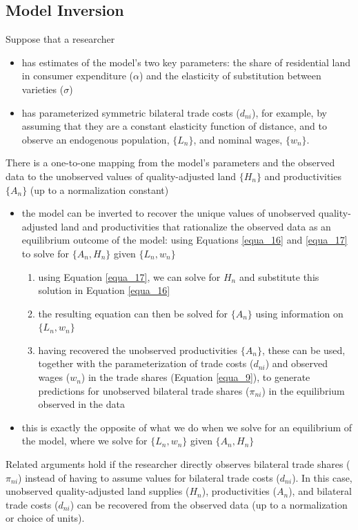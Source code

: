 \documentclass[11pt]{article}
\begin{document}
\subsection*{Model Inversion}
Suppose that a researcher
\begin{itemize}
\item has estimates of the model’s two key parameters: the share of residential land in consumer expenditure ($\alpha$) and the elasticity of substitution between varieties ($\sigma$)
\item has parameterized symmetric bilateral trade costs ($d_{ni}$), for example, by assuming that they are a constant elasticity function of distance, and to observe an endogenous population, $\lbrace L_{n} \rbrace$, and nominal wages, $\lbrace w_{n} \rbrace$. 
\end{itemize}
There is a one-to-one mapping from the model's parameters and the observed data to the unobserved values of quality-adjusted land $\lbrace H_{n} \rbrace$ and productivities $\lbrace A_{n} \rbrace$ (up to a normalization constant)
\begin{itemize}
\item the model can be inverted to recover the unique values of unobserved quality-adjusted land and productivities that rationalize the observed data as an equilibrium outcome of the model: using Equations \ref{equa_16} and \ref{equa_17} to solve for $\lbrace A_{n},H_{n} \rbrace$ given $\lbrace L_{n},w_{n} \rbrace$
\begin{enumerate}
\item using Equation \ref{equa_17}, we can solve for $H_{n}$  and substitute this solution in Equation \ref{equa_16}
\item the resulting equation can then be solved for $\lbrace A_{n} \rbrace$ using information on $\lbrace L_{n},w_{n} \rbrace$
\item having recovered the unobserved productivities $\lbrace A_{n} \rbrace$, these can be used, together with the parameterization of trade costs ($d_{ni}$) and observed wages ($w_{n}$) in the trade shares (Equation \ref{equa_9}), to generate predictions for unobserved bilateral trade shares ($\pi_{ni}$) in the equilibrium observed in the data 
\end{enumerate}
\item this is exactly the opposite of what we do when we solve for an equilibrium of the model, where we solve for $\lbrace L_{n},w_{n} \rbrace$ given $\lbrace A_{n},H_{n} \rbrace$
\end{itemize}
Related arguments hold if the researcher directly observes bilateral trade shares ($\pi_{ni}$) instead of having to assume values for bilateral trade costs ($d_{ni}$). In this case, unobserved quality-adjusted land supplies ($H_{n}$), productivities ($A_{n}$), and bilateral trade costs ($d_{ni}$) can be recovered from the observed data (up to a normalization or choice of units).
\end{document}
